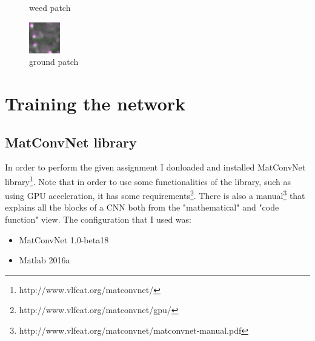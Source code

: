 \documentclass[]{report}
\begin{document}
\begin{figure}[!htb]
  \caption{weed patch}\label{fig:weed sample}
\endminipage\hfill
{}%
  \includegraphics[width=\linewidth]{ground.png}
  \caption{ground patch}\label{fig:ground sample}
\endminipage
\end{figure}



\chapter{Training the network}

\section{MatConvNet library}

In order to perform the given assignment I donloaded and installed MatConvNet library\footnote{http://www.vlfeat.org/matconvnet/}. Note that in order to use some functionalities of the library, such as using GPU acceleration, it has some requirements\footnote{http://www.vlfeat.org/matconvnet/gpu/}.
There is also a manual\footnote{http://www.vlfeat.org/matconvnet/matconvnet-manual.pdf} that explains all the blocks of a CNN both from the "mathematical" and "code function" view. The configuration that I used was:

\begin{itemize}

	\item MatConvNet 1.0-beta18
	\item Matlab 2016a	
	
\end{itemize}  
\end{document}
